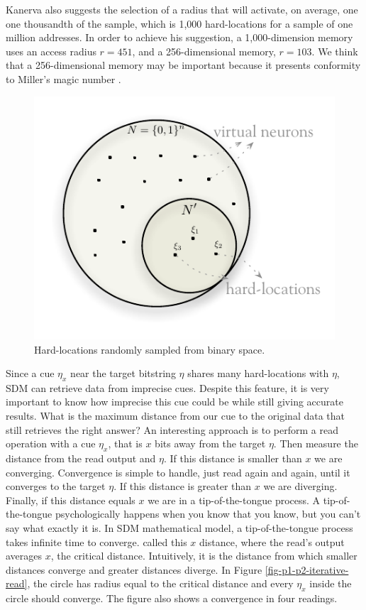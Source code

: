 Kanerva also suggests the selection of a radius that will activate, on average, one one thousandth of the sample, which is 1,000 hard-locations for a sample of one million addresses. In order to achieve his suggestion, a 1,000-dimension memory uses an access radius $r=451$, and a 256-dimensional memory, $r=103$. We think that a 256-dimensional memory may be important because it presents conformity to Miller's magic number \citep{Linhares2011}.

\begin{figure}[!htb]
\centering\includegraphics[scale=0.75]{./images02/hardlocations.pdf}

\caption{Hard-locations randomly sampled from binary space.\label{fig-hardlocations}}
\end{figure}


Since a cue $\eta_{x}$ near the target bitstring $\eta$ shares many hard-locations with $\eta$, SDM can retrieve data from imprecise cues. Despite this feature, it is very important to know how imprecise this cue could be while still giving accurate results. What is the maximum distance from our cue to the original data that still retrieves the right answer? An interesting approach is to perform a read operation with a cue $\eta_{x}$, that is $x$ bits away from the target $\eta$.  Then measure the distance from the read output and $\eta$. If this distance is smaller than $x$ we are converging. Convergence is simple to handle, just read again and again, until it converges to the target $\eta$. If this distance is greater than $x$ we are diverging. Finally, if this distance equals $x$ we are in a tip-of-the-tongue process.  A tip-of-the-tongue psychologically happens when you know that you know, but you can't say what exactly it is. In SDM mathematical model, a tip-of-the-tongue process takes infinite time to converge. \citet{Kanerva1988} called this $x$ distance, where the read's output averages $x$, the critical distance. Intuitively, it is the distance from which smaller distances converge and greater distances diverge. In Figure \ref{fig-p1-p2-iterative-read}, the circle has radius equal to the critical distance and every $\eta_{x}$ inside the circle should converge.  The figure also shows a convergence in four readings.

